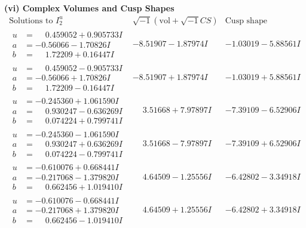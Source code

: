\documentclass[1p]{elsarticle_modified}
\theoremstyle{definition}
\newcommand{\I}{\sqrt{-1}}
\begin{document}
\newpage\flushleft \textbf{(vi) Complex Volumes and Cusp Shapes}
$$\begin{array}{c|c|c}  
\text{Solutions to }I^u_{2}& \I (\text{vol} + \sqrt{-1}CS) & \text{Cusp shape}\\
 \hline 
\begin{aligned}
u &= \phantom{-}0.459052 + 0.905733 I \\
a &= -0.56066 - 1.70826 I \\
b &= \phantom{-}1.72209 + 0.16447 I\end{aligned}
 & -8.51907 - 1.87974 I & -1.03019 - 5.88561 I \\ \hline\begin{aligned}
u &= \phantom{-}0.459052 - 0.905733 I \\
a &= -0.56066 + 1.70826 I \\
b &= \phantom{-}1.72209 - 0.16447 I\end{aligned}
 & -8.51907 + 1.87974 I & -1.03019 + 5.88561 I \\ \hline\begin{aligned}
u &= -0.245360 + 1.061590 I \\
a &= \phantom{-}0.930247 - 0.636269 I \\
b &= \phantom{-}0.074224 + 0.799741 I\end{aligned}
 & \phantom{-}3.51668 + 7.97897 I & -7.39109 - 6.52906 I \\ \hline\begin{aligned}
u &= -0.245360 - 1.061590 I \\
a &= \phantom{-}0.930247 + 0.636269 I \\
b &= \phantom{-}0.074224 - 0.799741 I\end{aligned}
 & \phantom{-}3.51668 - 7.97897 I & -7.39109 + 6.52906 I \\ \hline\begin{aligned}
u &= -0.610076 + 0.668441 I \\
a &= -0.217068 - 1.379820 I \\
b &= \phantom{-}0.662456 + 1.019410 I\end{aligned}
 & \phantom{-}4.64509 - 1.25556 I & -6.42802 - 3.34918 I \\ \hline\begin{aligned}
u &= -0.610076 - 0.668441 I \\
a &= -0.217068 + 1.379820 I \\
b &= \phantom{-}0.662456 - 1.019410 I\end{aligned}
 & \phantom{-}4.64509 + 1.25556 I & -6.42802 + 3.34918 I \\ \hline\begin{aligned}

\end{aligned}
\end{array}$$
\end{document}
